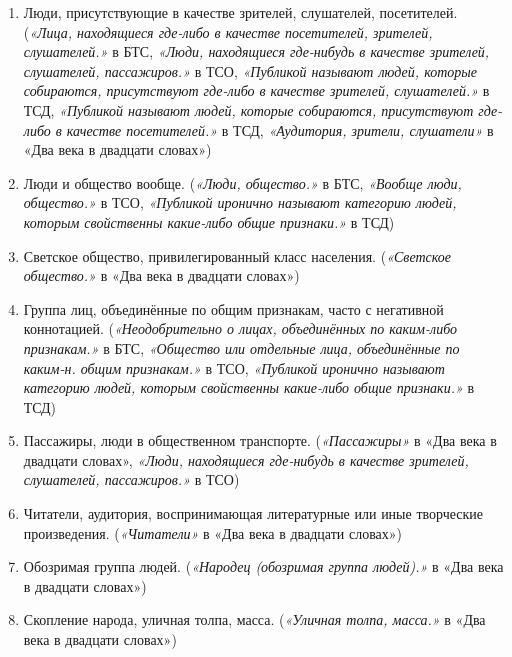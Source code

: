 \begin{enumerate}
    \item Люди, присутствующие в качестве зрителей, слушателей, посетителей.
(\textit{«Лица, находящиеся где-либо в качестве посетителей, зрителей, слушателей.»} в БТС,
\textit{«Люди, находящиеся где-нибудь в качестве зрителей, слушателей, пассажиров.»} в ТСО,
\textit{«Публикой называют людей, которые собираются, присутствуют где-либо в качестве зрителей, слушателей.»} в ТСД,
\textit{«Публикой называют людей, которые собираются, присутствуют где-либо в качестве посетителей.»} в ТСД,
\textit{«Аудитория, зрители, слушатели»} в «Два века в двадцати словах»)

    \item Люди и общество вообще.
(\textit{«Люди, общество.»} в БТС,
\textit{«Вообще люди, общество.»} в ТСО,
\textit{«Публикой иронично называют категорию людей, которым свойственны какие-либо общие признаки.»} в ТСД)

    \item Светское общество, привилегированный класс населения.
(\textit{«Светское общество.»} в «Два века в двадцати словах»)

    \item Группа лиц, объединённые по общим признакам, часто с негативной коннотацией.
(\textit{«Неодобрительно о лицах, объединённых по каким-либо признакам.»} в БТС,
\textit{«Общество или отдельные лица, объединённые по каким-н. общим признакам.»} в ТСО,
\textit{«Публикой иронично называют категорию людей, которым свойственны какие-либо общие признаки.»} в ТСД)

    \item Пассажиры, люди в общественном транспорте.
(\textit{«Пассажиры»} в «Два века в двадцати словах»,
\textit{«Люди, находящиеся где-нибудь в качестве зрителей, слушателей, пассажиров.»} в ТСО)

    \item Читатели, аудитория, воспринимающая литературные или иные творческие произведения.
(\textit{«Читатели»} в «Два века в двадцати словах»)

    \item Обозримая группа людей.
(\textit{«Народец (обозримая группа людей).»} в «Два века в двадцати словах»)

    \item Скопление народа, уличная толпа, масса.
(\textit{«Уличная толпа, масса.»} в «Два века в двадцати словах»)

\end{enumerate}

